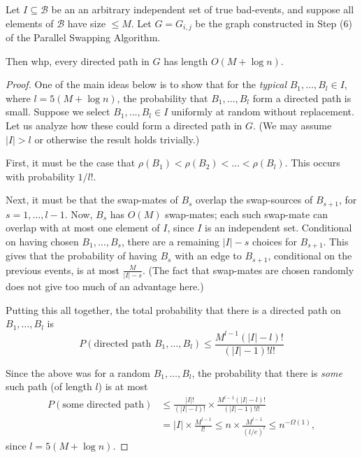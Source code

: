 \begin{proposition}
Let $I \subseteq \mathcal B$ be an an arbitrary independent set of true bad-events, and suppose all elements of $\mathcal B$ have size $\leq M$. Let $G = G_{i,j}$ be the graph constructed in Step (6) of the Parallel Swapping Algorithm.

Then whp, every directed path in $G$ has length $O(M + \log n)$.
\end{proposition}
\begin{proof}
 One of the main ideas below is to show that for the \emph{typical} 
$B_1, \dots, B_l \in I$, where $l = 5(M + \log n)$, the probability that $B_1, \dots, B_l$ form a directed path is small.  Suppose we select $B_1, \dots, B_l \in I$ uniformly at random without replacement. Let us analyze how these could form a directed path in $G$. (We may assume $|I| > l$ or otherwise the result holds trivially.)

First, it must be the case that $\rho(B_1) < \rho(B_2) < \dots < \rho(B_l)$. This occurs with probability $1/l!$.

Next, it must be that the swap-mates of $B_s$ overlap the swap-sources of $B_{s+1}$, for $s = 1, \dots, l-1$. Now, $B_s$ has $O(M)$ swap-mates; each such swap-mate can overlap with at most one element of $I$, since $I$ is an independent set.  Conditional on having chosen $B_1, \dots, B_s$, there are a remaining $|I|-s$ choices for $B_{s+1}$. This gives that the probability of having $B_s$ with an edge to $B_{s+1}$, conditional on the previous events, is at most $\frac{M}{|I|-s}$. (The fact that swap-mates are chosen randomly does not give too much of an advantage here.)

Putting this all together, the total probability that there is a directed path on $B_1, \dots, B_l$ is
$$
P(\text{directed path $B_1, \dots, B_l$}) \leq \frac {M^{l-1} ( |I| - l ) !}{ ( |I|-1 )! l!}
$$

Since the above was for a random $B_1, \dots, B_l$, the probability that there is \emph{some} such path (of length $l$) is at most
{\allowdisplaybreaks
\begin{align*}
P(\text{some directed path}) & \leq  \frac{|I|!}{(|I| - l)!} \times \frac{M^{l-1} (|I| - l)!}{(|I|-1)! l!} \\
&= |I| \times  \frac{M^{l-1}}{l!} \leq  n \times  \frac{M^{l-1}}{(l/e)^l} \leq n^{-\Omega(1)},
\end{align*}
}
since  $l = 5(M + \log n)$. 
\end{proof}

